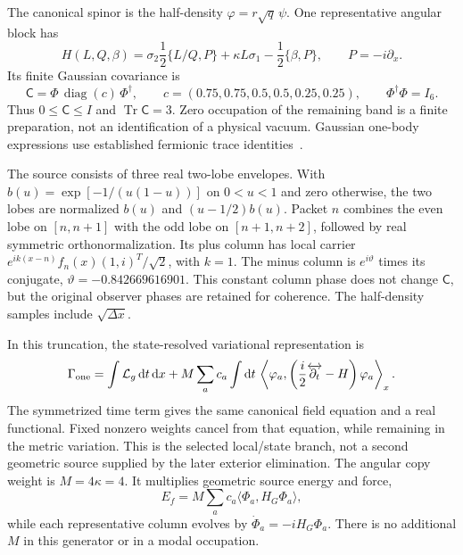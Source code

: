 \documentclass[11pt]{article}
\newcommand{\dd}{\mathrm{d}}
\newcommand{\Tr}{\operatorname{Tr}}
\newcommand{\Cov}{\mathsf C}
\begin{document}
The canonical spinor is the half-density $\varphi=r\sqrt q\,\psi$.
One representative angular block has
\begin{equation}\label{eq:dirac}
H(L,Q,\beta)=\sigma_2\frac12\{L/Q,P\}
 +\kappa L\sigma_1-\frac12\{\beta,P\},\qquad P=-i\partial_x.
\end{equation}
Its finite Gaussian covariance is
\begin{equation}\label{eq:covariance}
\Cov=\Phi\,\operatorname{diag}(c)\,\Phi^\dagger,\qquad
c=(0.75,0.75,0.5,0.5,0.25,0.25),\qquad \Phi^\dagger\Phi=I_6.
\end{equation}
Thus $0\le\Cov\le I$ and $\Tr\Cov=3$. Zero occupation of the remaining
band is a finite preparation, not an identification of a physical vacuum.
Gaussian one-body expressions use established fermionic trace
identities~\cite{Klich2003}.

The source consists of three real two-lobe envelopes. With
$b(u)=\exp[-1/(u(1-u))]$ on $0<u<1$ and zero otherwise, the two lobes are
normalized $b(u)$ and $(u-1/2)b(u)$. Packet $n$ combines the even lobe on
$[n,n+1]$ with the odd lobe on $[n+1,n+2]$, followed by real symmetric
orthonormalization. Its plus column has local carrier
$e^{ik(x-n)}f_n(x)(1,i)^T/\sqrt2$, with $k=1$.
The minus column is $e^{i\vartheta}$ times its conjugate,
$\vartheta=-0.842669616901$. This constant column phase does not change
$\Cov$, but the original observer phases are retained for coherence.
The half-density samples include $\sqrt{\Delta x}$.

In this truncation, the state-resolved variational representation is
\begin{equation}\label{eq:combinedaction}
\Gamma_{\rm one}=\int\mathcal L_g\,\dd t\,\dd x+
M\sum_a c_a\int\dd t\,
\left\langle\varphi_a,
\left(\frac{i}{2}\overleftrightarrow{\partial_t}-H\right)
\varphi_a\right\rangle_x .
\end{equation}
The symmetrized time term gives the same canonical field equation and a
real functional. Fixed nonzero weights cancel from that equation, while
remaining in the metric variation. This is the selected local/state branch,
not a second geometric source supplied by the later exterior elimination.
The angular copy weight is $M=4\kappa=4$. It multiplies geometric source
energy and force,
\begin{equation}\label{eq:sourceenergy}
E_f=M\sum_a c_a\langle\Phi_a,H_G\Phi_a\rangle,
\end{equation}
while each representative column evolves by $\dot\Phi_a=-iH_G\Phi_a$.
There is no additional $M$ in this generator or in a modal occupation.
\end{document}
